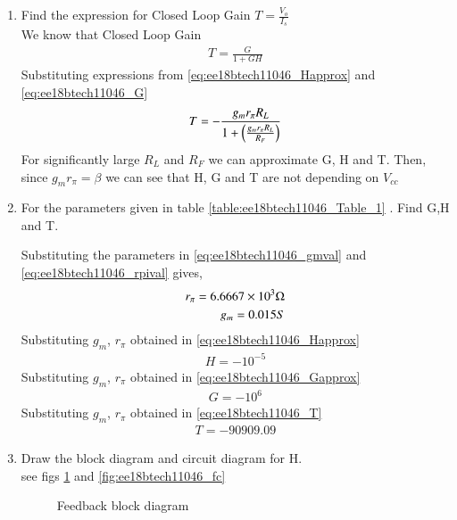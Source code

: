 \begin{enumerate}[label=\arabic*.,ref=\theenumi]
%
\item Find the expression for Closed Loop Gain $T = \frac{V_{o}}{I_{s}}$ \\
%
We know that Closed Loop Gain
\begin{align}
T = \frac{G}{1+GH}
\end{align}
Substituting expressions from \eqref{eq:ee18btech11046_Happrox} and \eqref{eq:ee18btech11046_G}
\begin{align}
T = -\frac{g_{m}r_{\pi}R_{L}}{1+\left(\frac{g_{m}r_{\pi}R_{L}}{R_{F}}\right)}
\label{eq:ee18btech11046_T}
\end{align}
For significantly large $R_{L}$ and $R_{F}$ we can approximate G, H and T. Then, since $g_{m}r_{\pi}=\beta$ we can see that H, G and T are not depending on $V_{cc}$
%
\item For the parameters given in table \ref{table:ee18btech11046_Table_1} . Find G,H and T.
%
\begin{table}[!ht]
\centering

\caption{}
\label{table:ee18btech11046_Table_1}
\end{table}
%
\solution
Substituting the parameters in \eqref{eq:ee18btech11046_gmval} and \eqref{eq:ee18btech11046_rpival} gives,
\begin{align}
r_{\pi} = 6.6667\times 10^{3} \ohm
\\
g_{m} = 0.015 S 
\end{align}
Substituting $g_{m}$, $r_{\pi}$ obtained in 
\eqref{eq:ee18btech11046_Happrox}
\begin{align}
H = -10^{-5}
\end{align}
Substituting $g_{m}$, $r_{\pi}$ obtained in 
\eqref{eq:ee18btech11046_Gapprox}
\begin{align}
G = -10^{6}
\end{align}
Substituting $g_{m}$, $r_{\pi}$ obtained in 
\eqref{eq:ee18btech11046_T}
\begin{align}
T = -90909.09
\end{align}

\item Draw the block diagram and circuit diagram for H.
\\
\solution see figs \ref{fig:ee18btech11046_Hblock}  and \ref{fig:ee18btech11046_fc}
%
\renewcommand{\thefigure}{\theenumi.\arabic{figure}}

\begin{figure}[ht!]
	\begin{center}
		\resizebox{\columnwidth}{!}{}
	\end{center}
	\caption{Feedback block diagram}
	\label{fig:ee18btech11046_Hblock}
\end{figure}


\end{enumerate}
